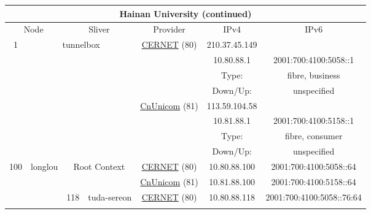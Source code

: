 \begin{small}
\begin{center}
\begin{longtable}{|c|c|c|c|c|c|c|c|}
\endfirsthead
\hline
 \multicolumn{8}{|c|}{\textbf{Hainan University (continued)}} \\ \hline
 \multicolumn{2}{|p{8em}|}{Node} & \multicolumn{2}{|p{8em}|}{Sliver} & \multicolumn{2}{|p{8em}|}{Provider} & IPv4 & IPv6 \\ \hline
\endhead
 \multirow{8}{*}{\tiny{1}} & \multicolumn{3}{|c|}{\multirow{8}{*}{\tiny{tunnelbox}}} & \multicolumn{2}{|c|}{\multirow{4}{*}{\tiny{\href{http://www.cernet.edu.cn}{CERNET} (80)}}} & \tiny{210.37.45.149} & \frownie{} \\* \cline{7-7}\cline{8-8}
  & \multicolumn{3}{|c|}{} & \multicolumn{2}{|c|}{} & \tiny{10.80.88.1} & \tiny{2001:700:4100:5058::1} \\* \cline{7-7}\cline{8-8}
  & \multicolumn{3}{|c|}{} & \multicolumn{2}{|c|}{} & Type: & fibre, business \\* \cline{7-7}\cline{8-8}
  & \multicolumn{3}{|c|}{} & \multicolumn{2}{|c|}{} & Down/Up:  & unspecified \\* \cline{5-5}\cline{6-6}\cline{7-7}\cline{8-8}
  & \multicolumn{3}{|c|}{} & \multicolumn{2}{|c|}{\multirow{4}{*}{\tiny{\href{http://www.chinaunicom.com}{CnUnicom} (81)}}} & \tiny{113.59.104.58} & \frownie{} \\* \cline{7-7}\cline{8-8}
  & \multicolumn{3}{|c|}{} & \multicolumn{2}{|c|}{} & \tiny{10.81.88.1} & \tiny{2001:700:4100:5158::1} \\* \cline{7-7}\cline{8-8}
  & \multicolumn{3}{|c|}{} & \multicolumn{2}{|c|}{} & Type: & fibre, consumer \\* \cline{7-7}\cline{8-8}
  & \multicolumn{3}{|c|}{} & \multicolumn{2}{|c|}{} & Down/Up:  & unspecified \\ \hline
 \multirow{32}{*}{\tiny{100}} & \multicolumn{1}{|l|}{\multirow{32}{*}{\tiny{longlou}}} & \multicolumn{2}{|c|}{\multirow{2}{*}{\tiny{Root Context}}} & \multicolumn{2}{|c|}{\tiny{\href{http://www.cernet.edu.cn}{CERNET} (80)}} & \tiny{10.80.88.100} & \tiny{2001:700:4100:5058::64} \\* \cline{5-5}\cline{6-6}\cline{7-7}\cline{8-8}
  &  & \multicolumn{2}{|c|}{} & \multicolumn{2}{|c|}{\tiny{\href{http://www.chinaunicom.com}{CnUnicom} (81)}} & \tiny{10.81.88.100} & \tiny{2001:700:4100:5158::64} \\* \cline{3-3}\cline{4-4}\cline{5-5}\cline{6-6}\cline{7-7}\cline{8-8}
  &  & \multirow{2}{*}{\tiny{118}} & \multicolumn{1}{|l|}{\multirow{2}{*}{\tiny{tuda-sereon}}} & \multicolumn{2}{|c|}{\tiny{\href{http://www.cernet.edu.cn}{CERNET} (80)}} & \tiny{10.80.88.118} & \tiny{2001:700:4100:5058::76:64} \\* \cline{5-5}\cline{6-6}\cline{7-7}\cline{8-8}

\end{longtable}
\end{center}
\end{small}
